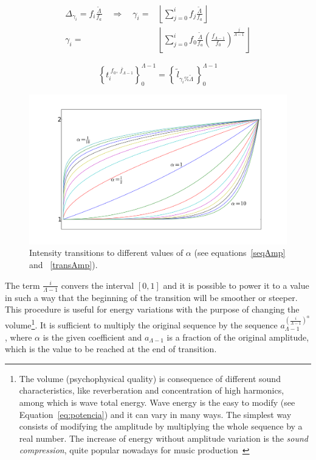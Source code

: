 \documentclass[
 aip,
 jmp,
 amsmath,amssymb,
 reprint,
]{revtex4-1}
\begin{document}
\begin{equation}\label{indiceExponencial}
\begin{split}
 \Delta_{\gamma_i}= f_i\frac{\widetilde{\Lambda}}{f_a} \quad \Rightarrow  \quad \gamma_i= & \left \lfloor \sum_{j=0}^{i} f_j\frac{\widetilde{\Lambda}}{f_a} \right \rfloor \\ \gamma_i = & \left \lfloor \sum_{j=0}^{i} f_0 \frac{\widetilde{\Lambda}}{f_a} \left ( \frac{f_{\Lambda-1}}{f_0} \right ) ^{\frac{j}{\Lambda -1}} \right \rfloor
\end{split}
\end{equation}

\begin{equation}\label{serieAmostralLog}
 \left\{t_i^{\;\overline{f_0,\,f_{\Lambda-1}}}\right\}_0^{\Lambda-1}=\left\{\,\widetilde{l}_{\gamma_i \% \widetilde{\Lambda}}\,\right\}_0^{\Lambda-1}
\end{equation}

\begin{figure}[h!]
     \centering
         \includegraphics[width=\columnwidth]{figures/transicao}
     \caption{Intensity transitions to different values of $\alpha$ (see equations~\ref{seqAmp} and ~\ref{transAmp}).}
         \label{fig:transicao}
\end{figure}

The term $\frac{i}{\Lambda-1}$ convers the interval $[0,1]$ and it is possible to power it to a value in such a way that the beginning of the transition will be smoother or steeper.
This procedure is useful for energy variations with the purpose of changing the volume\footnote{The volume (psychophysical quality) is consequence of different sound characteristics, like reverberation and concentration of high harmonics, among which is wave total energy. Wave energy is the easy to modify (see Equation~\ref{eq:potencia}) and it can vary in many ways. The simplest way consists of modifying the amplitude by multiplying the whole sequence by a real number. The increase of energy without amplitude variation is the \emph{sound compression}, quite popular nowadays for music production~\cite{guillaume}}. It is sufficient to multiply the original sequence by the sequence $a_{\Lambda-1}^{\left( \frac{i}{\Lambda-1} \right )^\alpha}$, where $\alpha$ is the given coefficient and $a_{\Lambda-1}$ is a fraction of the original amplitude, which is the value to be reached at the end of transition.
\end{document}
